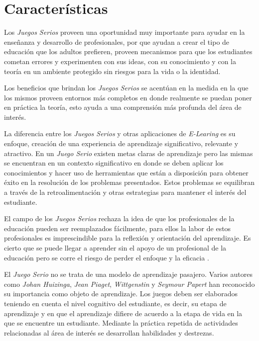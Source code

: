 \section{Características}

Los \emph{Juegos Serios} proveen una oportunidad muy importante para ayudar en
la enseñanza y desarrollo de profesionales, por que
ayudan a crear el tipo de educación que los adultos prefieren, proveen
mecanismos para que los estudiantes cometan errores y experimenten con sus
ideas, con su conocimiento y con la teoría en un ambiente protegido sin riesgos
para la vida o la identidad. 

Los beneficios que brindan los \emph{Juegos Serios} se acentúan en la medida en
la que los mismos proveen entornos más completos en donde realmente se puedan
poner en práctica la teoría, esto ayuda a una comprensión más profunda del área
de interés.

La diferencia entre los \emph{Juegos Serios} y otras aplicaciones de
\emph{E-Learing} es su enfoque,  creación de una
experiencia de aprendizaje significativo, relevante y atractivo. En un \emph{Juego Serio} existen metas claras de aprendizaje pero las
mismas se encuentran en un contexto significativo en donde se deben aplicar los
conocimientos y hacer uso de herramientas que están a disposición para obtener
éxito en la resolución de los problemas presentados. Estos problemas se
equilibran a través de la retroalimentación y otras estrategias para mantener el
interés del estudiante\cite{papertian:const}.

El campo de los \emph{Juegos Serios} rechaza la idea de que los profesionales de
la educación pueden ser reemplazados fácilmente, para ellos la labor de estos
profesionales es imprescindible para la reflexión y orientación del aprendizaje.
Es cierto que se puede llegar a aprender sin el apoyo de un profesional de la
educación pero se corre el riesgo de perder el enfoque y la eficacia
\cite{elearning:seiousgames}. 

El \emph{Juego Serio} no se trata de una modelo de aprendizaje pasajero. Varios
autores como \emph{Johan Huizinga}, \emph{Jean Piaget}, \emph{Wittgenstin} y
\emph{Seymour Papert} han reconocido su importancia como objeto de aprendizaje.
Los juegos deben ser elaborados teniendo en cuenta el nivel cognitivo del
estudiante, es decir, su etapa de aprendizaje y en que el aprendizaje difiere de
acuerdo a la etapa de vida en la que se encuentre un estudiante. Mediante la
práctica repetida de actividades relacionadas al área de interés se desarrollan
habilidades y destrezas\cite{education:games}.

